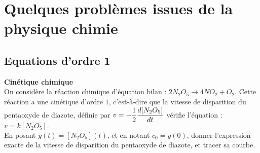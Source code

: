 \documentclass[a4paper, 11pt,reqno]{article}
\begin{document}
\noindent \section{{\bf\Large{Quelques problèmes issues de la physique chimie}}}
\subsection{Equations d'ordre 1}
\vspace{0.2cm}

\begin{exercice}  \; \textbf{Cin\'etique chimique}\\
On consid\`ere la r\'eaction chimique d'\'equation bilan : $2N_2O_5 \rightarrow 4 NO_2 + O_2$. Cette r\'eaction a une cin\'etique d'ordre $1$, c'est-\`a-dire que la vitesse de disparition du pentaoxyde de diazote, d\'efinie par $v = \displaystyle - \frac{1}{2} \frac{d [N_2O_5]}{dt}$ v\'erifie l'\'equation : $v = k [N_2O_5].$\\
En posant $y(t) = [N_2O_5](t)$, et en notant $c_0=y(0)$, donner l'expression exacte de la vitesse de disparition du pentaoxyde de diazote, et tracer sa courbe. %

\end{exercice}
\end{document}
